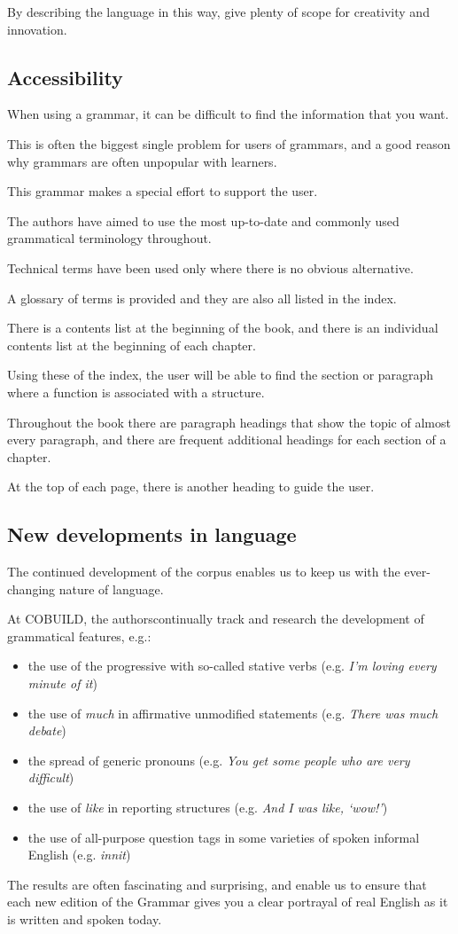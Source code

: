 \documentclass[oneside]{book}
\numberwithin{equation}{section}
\begin{document}
By describing the language in this way,  give plenty of scope for creativity and innovation.

\subsection{Accessibility}
When using a grammar, it can be difficult to find the information that you want.

This is often the biggest single problem for users of grammars, and a good reason why grammars are often unpopular with learners.

This grammar makes a special effort to support the user.

%
The authors have aimed to use the most up-to-date and commonly used grammatical terminology throughout.

Technical terms have been used only where there is no obvious alternative.

A glossary of terms is provided and they are also all listed in the index.

%
There is a contents list at the beginning of the book, and there is an individual contents list at the beginning of each chapter.

Using these of the index, the user will be able to find the section or paragraph where a function is associated with a structure.

%
Throughout the book there are paragraph headings that show the topic of almost every paragraph, and there are frequent additional headings for each section of a chapter.

At the top of each page, there is another heading to guide the user.

\subsection{New developments in language}
The continued development of the corpus enables us to keep us with the ever-changing nature of language.

At COBUILD, the authorscontinually track and research the development of grammatical features, e.g.:
\begin{itemize}
    \item[(i)] the use of the progressive with so-called stative verbs (e.g. \textit{I'm loving every minute of it})
    \item[(ii)] the use of \textit{much} in affirmative unmodified statements (e.g. \textit{There was much debate})
    \item[(iii)] the spread of generic pronouns (e.g. \textit{You get some people who are very difficult})
    \item[(iv)] the use of \textit{like} in reporting structures (e.g. \textit{And I was like, `wow!'})
    \item[(v)] the use of all-purpose question tags in some varieties of spoken informal English (e.g. \textit{innit})
\end{itemize}
The results are often fascinating and surprising, and enable us to ensure that each new edition of the Grammar gives you a clear portrayal of real English as it is written and spoken today.
\end{document}
